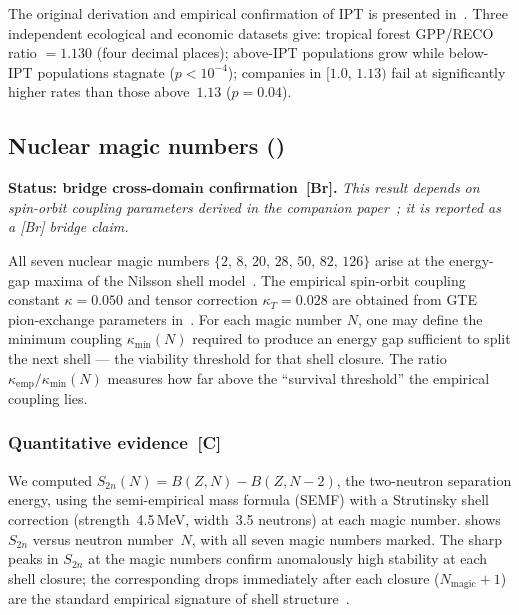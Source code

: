 \documentclass[11pt]{article}
\theoremstyle{remark}
\newcommand{\IPT}{\mathrm{IPT}}
\begin{document}
The original derivation and empirical confirmation of $\IPT$ is presented
in~\cite{SpivackIPT}.
Three independent ecological and economic datasets give:
tropical forest GPP/RECO ratio $= 1.130$ (four decimal places);
above-$\IPT$ populations grow while below-$\IPT$ populations stagnate ($p < 10^{-4}$);
companies in $[1.0,\, 1.13)$ fail at significantly higher rates than those
above~$1.13$ ($p = 0.04$).

\subsection{\texorpdfstring{Nuclear magic numbers (\cite{spivack2025nuclear_physics})}{Nuclear magic numbers}}

\noindent\textbf{Status: bridge cross-domain confirmation~\textbf{[Br]}.}
\emph{This result depends on spin-orbit coupling parameters derived in the companion
paper~\cite{spivack2025nuclear_physics}; it is reported as a [Br] bridge claim.}

\smallskip
All seven nuclear magic numbers $\{2,\,8,\,20,\,28,\,50,\,82,\,126\}$
arise at the energy-gap maxima of the Nilsson shell model~\cite{Nilsson1955}.
The empirical spin-orbit coupling constant $\kappa = 0.050$ and tensor correction
$\kappa_T = 0.028$ are obtained from GTE pion-exchange parameters
in~\cite{spivack2025nuclear_physics}.
For each magic number $N$, one may define the minimum coupling $\kappa_\mathrm{min}(N)$
required to produce an energy gap sufficient to split the next shell --- the
viability threshold for that shell closure.
The ratio $\kappa_\mathrm{emp}/\kappa_\mathrm{min}(N)$ measures how far above
the ``survival threshold'' the empirical coupling lies.

\subsubsection*{Quantitative evidence~\textbf{[C]}}

We computed $S_{2n}(N) = B(Z,N) - B(Z,N-2)$, the two-neutron separation energy,
using the semi-empirical mass formula (SEMF) with a Strutinsky shell correction
(strength~4.5\,MeV, width~3.5 neutrons) at each magic number.
 shows $S_{2n}$ versus neutron number~$N$, with all seven
magic numbers marked.
The sharp peaks in $S_{2n}$ at the magic numbers confirm anomalously high
stability at each shell closure; the corresponding drops immediately after
each closure ($N_\mathrm{magic} + 1$) are the standard empirical signature of
shell structure~\cite{Krane1987}.
\end{document}
